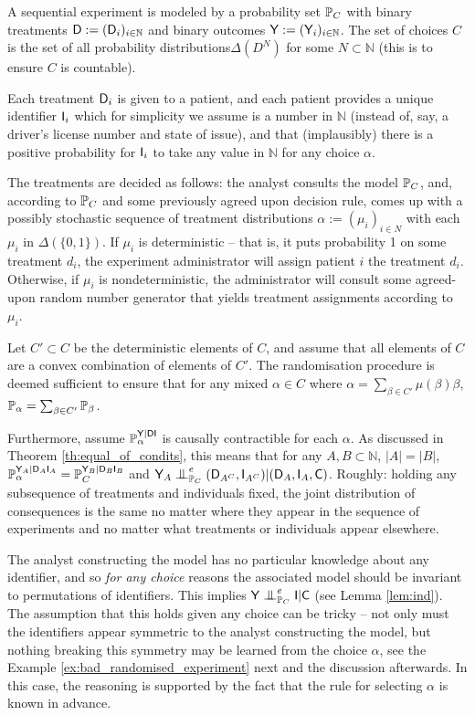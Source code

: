 \begin{example}\label{ex:randomised_experiment}
A sequential experiment is modeled by a probability set $\mathbb{P}_C$ with binary treatments $\mathsf{D}:=(\mathsf{D}_i)_{i\in \mathbb{N}}$ and binary outcomes $\mathsf{Y}:=(\mathsf{Y}_i)_{i\in\mathbb{N}}$. The set of choices $C$ is the set of all probability distributions$\Delta(D^N)$ for some $N\subset\mathbb{N}$ (this is to ensure $C$ is countable).

Each treatment $\mathsf{D}_i$ is given to a patient, and each patient provides a unique identifier $\mathsf{I}_i$ which for simplicity we assume is a number in $\mathbb{N}$ (instead of, say, a driver's license number and state of issue), and that (implausibly) there is a positive probability for $\mathsf{I}_i$ to take any value in $\mathbb{N}$ for any choice $\alpha$.

The treatments are decided as follows: the analyst consults the model $\mathbb{P}_C$, and, according to $\mathbb{P}_C$ and some previously agreed upon decision rule, comes up with a possibly stochastic sequence  of treatment distributions $\alpha:=(\mu_i)_{i\in N}$ with each $\mu_i$ in $\Delta(\{0,1\})$. If $\mu_i$ is deterministic -- that is, it puts probability 1 on some treatment $d_i$, the experiment administrator will assign patient $i$ the treatment $d_i$. Otherwise, if $\mu_i$ is nondeterministic, the administrator will consult some agreed-upon random number generator that yields treatment assignments according to $\mu_i$.

Let $C'\subset C$ be the deterministic elements of $C$, and assume that all elements of $C$ are a convex combination of elements of $C'$. The randomisation procedure is deemed sufficient to ensure that for any mixed $\alpha\in C$ where $\alpha = \sum_{\beta\in C'} \mu(\beta) \beta$, $\mathbb{P}_\alpha = \sum_{\beta\in C'} \mathbb{P}_\beta$.

Furthermore, assume $\mathbb{P}_\alpha^{\mathsf{Y}|\mathsf{DI}}$ is causally contractible for each $\alpha$. As discussed in Theorem \ref{th:equal_of_condits}, this means that for any $A,B\subset\mathbb{N}$, $|A|=|B|$, $\mathbb{P}_\alpha^{\mathsf{Y}_A|\mathsf{D}_A\mathsf{I}_A}=\mathbb{P}_C^{\mathsf{Y}_B|\mathsf{D}_B\mathsf{I}_B}$ and $\RV{Y}_A\CI^e_{\prob{P}_C} (\RV{D}_{A^C},\RV{I}_{A^C})|(\RV{D}_A,\RV{I}_A,\RV{C})$. Roughly: holding any subsequence of treatments and individuals fixed, the joint distribution of consequences is the same no matter where they appear in the sequence of experiments and no matter what treatments or individuals appear elsewhere.

The analyst constructing the model has no particular knowledge about any identifier, and so \emph{for any choice} reasons the associated model should be invariant to permutations of identifiers. This implies $\RV{Y}\CI^e_{\prob{P}_C} \RV{I}|\RV{C}$ (see Lemma \ref{lem:ind}). The assumption that this holds given any choice can be tricky -- not only must the identifiers appear symmetric to the analyst constructing the model, but nothing breaking this symmetry may be learned from the choice $\alpha$, see the Example \ref{ex:bad_randomised_experiment} next and the discussion afterwards. In this case, the reasoning is supported by the fact that the rule for selecting $\alpha$ is known in advance.


\end{example}
